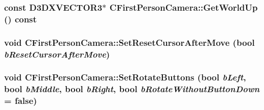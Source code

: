 \label{class_c_first_person_camera_a0ca46ea7c1d52786b1f149b4a12be986}
\hypertarget{class_c_first_person_camera_adb1c6d58d95eb38416facd8217d9e565}{
\subsubsection[{GetWorldUp}]{\setlength{\rightskip}{0pt plus 5cm}const D3DXVECTOR3$\ast$ CFirstPersonCamera::GetWorldUp () const}}
\label{class_c_first_person_camera_adb1c6d58d95eb38416facd8217d9e565}
\hypertarget{class_c_first_person_camera_a3dab3253ef350050b3cb03e6e059596a}{
\subsubsection[{SetResetCursorAfterMove}]{\setlength{\rightskip}{0pt plus 5cm}void CFirstPersonCamera::SetResetCursorAfterMove (bool {\em bResetCursorAfterMove})}}
\label{class_c_first_person_camera_a3dab3253ef350050b3cb03e6e059596a}
\hypertarget{class_c_first_person_camera_a96068a7b6bd4cdeeedc72877dba948dc}{
\subsubsection[{SetRotateButtons}]{\setlength{\rightskip}{0pt plus 5cm}void CFirstPersonCamera::SetRotateButtons (bool {\em bLeft}, \/  bool {\em bMiddle}, \/  bool {\em bRight}, \/  bool {\em bRotateWithoutButtonDown} = {\ttfamily false})}}
\label{class_c_first_person_camera_a96068a7b6bd4cdeeedc72877dba948dc}


